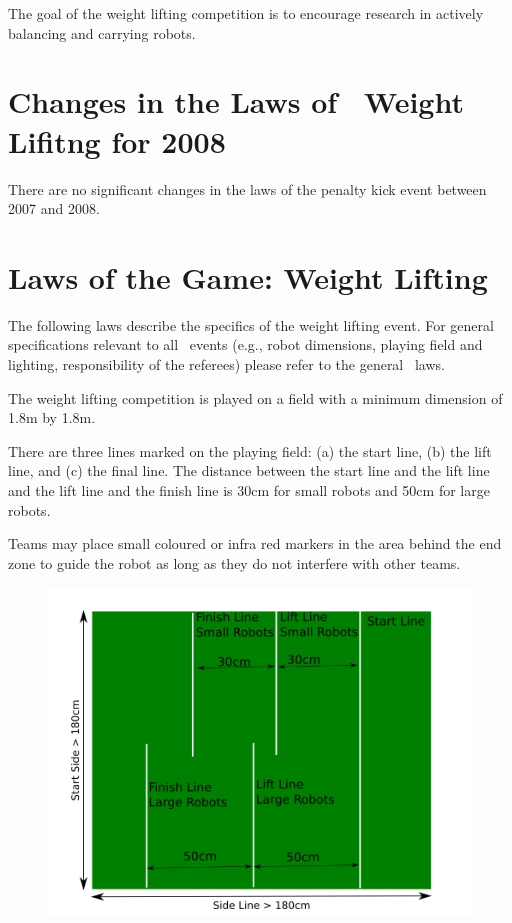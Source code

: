 \documentclass[12pt]{hurocup}
\begin{document}
The goal of the weight lifting competition is to encourage research in
actively balancing and carrying robots.

\section{Changes in the Laws of \HuroCup\ Weight Lifitng for 2008}

There are no significant changes in the laws of the penalty kick event
between 2007 and 2008.

\section{Laws of the Game: Weight Lifting}
\label{sec:weight-lifting-laws}

The following laws describe the specifics of the weight lifting
event. For general specifications relevant to all \HuroCup\ events
(e.g., robot dimensions, playing field and lighting, responsibility of
the referees) please refer to the general \HuroCup\ laws.

\label{mr-field}

\begin{lawlist}[WL]
\item The weight lifting competition is played on a field with a
minimum dimension of 1.8m by 1.8m.

\item There are three lines marked on the playing field: (a) the start line,
 (b) the lift line, and (c) the final line. The distance between the
 start line and the lift line and the lift line and the finish line is
 30cm for small robots and 50cm for large robots.

\item Teams may place small coloured or infra red markers in the area
 behind the end zone to guide the robot as long as they do not
 interfere with other teams.

\begin{figure}
  \begin{center}
    \includegraphics[width=0.70\linewidth]{Figures/weight-lifting}
  \end{center}
\end{figure}

\end{lawlist}
\end{document}
